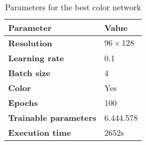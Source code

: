 \begin{table}[h!]
	\footnotesize
	\centering
	\begin{tabular}{ll}
	\hline
		\textbf{Parameter} & \textbf{Value}\\
	\hline
	\hline
		\textbf{Resolution} & $96\times128$\\
		\textbf{Learning rate} & 0.1\\
		\textbf{Batch size} & 4\\
		\textbf{Color} & Yes\\
		\textbf{Epochs} & 100\\
		\textbf{Trainable parameters} & 6.444.578\\
		\textbf{Execution time} & 2652s\\
	\hline
	\end{tabular}
	\caption{Parameters for the best color network}
	\label{tab:params_best_color_network}
\end{table}
